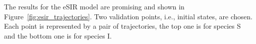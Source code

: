 \documentclass{article}
\begin{document}
The results for the eSIR model are promising and shown in Figure~\ref{fig:esir_trajectories}. Two validation points, i.e., initial states, are chosen. Each point is represented by a pair of trajectories, the top one is for species S and the bottom one is for species I.
\begin{figure}[ht]
    \centering
    

\end{figure}
\end{document}
